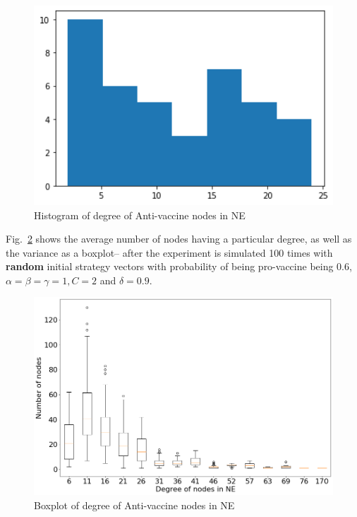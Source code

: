 \begin{figure}[H]
    \centering
    \includegraphics[width=12cm]{figs/antivax_degree.png}
    \caption{Histogram of degree of Anti-vaccine nodes in NE}
    \label{fig:antivax_degree}
\end{figure}


Fig.~\ref{fig:hist_boxplot_random}
shows the average number of nodes having a particular degree, as well as the variance as a boxplot-- after the experiment is simulated 100 times with \textbf{random} initial strategy vectors with probability of being pro-vaccine being 0.6, $\alpha = \beta = \gamma = 1, C = 2 $ and $\delta = 0.9 $. 

\begin{figure}[H]
    \centering
    \includegraphics[width=14cm]{figs/exp3-random.png}
    \caption{Boxplot of degree of Anti-vaccine nodes in NE}
    \label{fig:hist_boxplot_random}
\end{figure}

